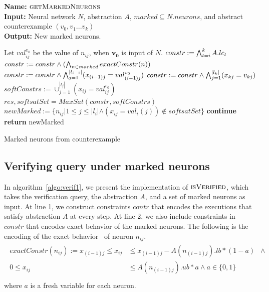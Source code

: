 \begin{algorithm}[t]
  \textbf{Name: } $\textsc{getMarkedNeurons}$ \\
  \textbf{Input: } Neural network $N$, \deeppoly{} abstraction $A$, $marked\subseteq N.neurons$, and abstract counterexample $({v_0}, {v_1} ... {v_k})$\\
  \textbf{Output: } New marked neurons. 
  \begin{algorithmic}[1]
    \State Let ${val^{v_0}_{ij}}$ be the value of $n_{ij}$, when $\boldsymbol{v_0}$ is input of $N$. 
     
        \State $constr := \bigwedge_{t=i}^k A.lc_t$
        \State $constr := constr \land (\bigwedge_{n \in marked} exactConstr(n))$ 
        \State $constr := constr \land \bigwedge_{j=1}^{|l_{i-1}|} (x_{(i-1)j} = val^{v_0}_{(i-1)j})$
        \State $constr := constr \land \bigwedge_{j=1}^{|l_k|} (x_{kj} = v_{kj})$
        \State $softConstrs := \cup_{j=1}^{|l_j|} (x_{ij} = val^{v_0}_{ij})$
        \State $res, softsatSet = MaxSat(constr, softConstrs)$ 
        \State $newMarked := \{n_{ij} | 1 \leq j \leq |l_i| \land (x_{ij} = val_i(j)) \notin  softsatSet\}$ 
          \State \textbf{continue}
        \Else
          \State \textbf{return} newMarked
        \EndIf 
      \EndIf
    \EndFor
  \end{algorithmic}
  \caption{Marked neurons from counterexample}
  \label{algo:refine2}
\end{algorithm}

\subsection{Verifying query under marked neurons}

In algorithm~\ref{algo:verif1}, we present the implementation of 
$\textsc{isVerified}$, which takes the verification query, the \deeppoly{} abstraction $A$,
and a set of marked neurons as input.
At line 1, we construct constraints $contr$ that encodes the executions that satisfy abstraction
$A$ at every step.
At line 2, we also include constraints in $constr$ that encodes exact behavior of the marked
neurons. The following is the encoding of the exact behavior~\cite{exact} of neuron $n_{ij}$.
\begin{align}
    \label{eq:reluexact}
    \begin{split}
      exactConstr(n_{ij}) := x_{(i-1)j} \leq x_{ij} &\leq x_{(i-1)j} - A(n_{(i-1)j}).lb*(1-a) \;\;\land  \\
        0 \leq x_{ij} &\leq A(n_{(i-1)j}).ub*a \land a \in \{0,1\} \\ 
    \end{split}
\end{align}
where $a$ is a fresh variable for each neuron.

